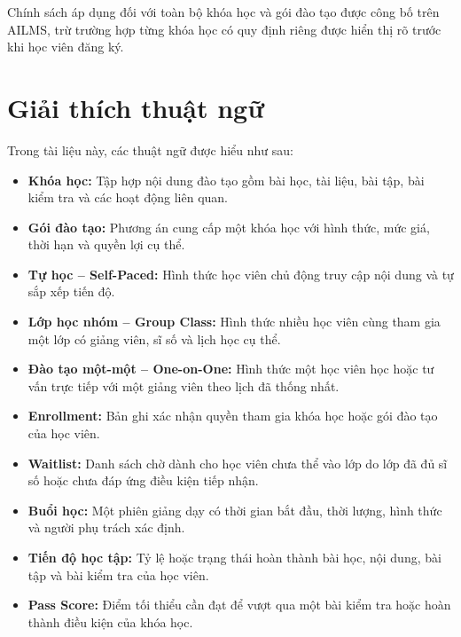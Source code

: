 \documentclass[12pt,a4paper]{article}
\begin{document}
Chính sách áp dụng đối với toàn bộ khóa học và gói đào tạo được công bố
trên AILMS, trừ trường hợp từng khóa học có quy định riêng được hiển thị rõ
trước khi học viên đăng ký.

\section{Giải thích thuật ngữ}

Trong tài liệu này, các thuật ngữ được hiểu như sau:

\begin{itemize}
    \item \textbf{Khóa học:} Tập hợp nội dung đào tạo gồm bài học,
    tài liệu, bài tập, bài kiểm tra và các hoạt động liên quan.

    \item \textbf{Gói đào tạo:} Phương án cung cấp một khóa học với
    hình thức, mức giá, thời hạn và quyền lợi cụ thể.

    \item \textbf{Tự học -- Self-Paced:} Hình thức học viên chủ động
    truy cập nội dung và tự sắp xếp tiến độ.

    \item \textbf{Lớp học nhóm -- Group Class:} Hình thức nhiều học viên
    cùng tham gia một lớp có giảng viên, sĩ số và lịch học cụ thể.

    \item \textbf{Đào tạo một-một -- One-on-One:} Hình thức một học viên
    học hoặc tư vấn trực tiếp với một giảng viên theo lịch đã thống nhất.

    \item \textbf{Enrollment:} Bản ghi xác nhận quyền tham gia khóa học
    hoặc gói đào tạo của học viên.

    \item \textbf{Waitlist:} Danh sách chờ dành cho học viên chưa thể vào lớp
    do lớp đã đủ sĩ số hoặc chưa đáp ứng điều kiện tiếp nhận.

    \item \textbf{Buổi học:} Một phiên giảng dạy có thời gian bắt đầu,
    thời lượng, hình thức và người phụ trách xác định.

    \item \textbf{Tiến độ học tập:} Tỷ lệ hoặc trạng thái hoàn thành bài học,
    nội dung, bài tập và bài kiểm tra của học viên.

    \item \textbf{Pass Score:} Điểm tối thiểu cần đạt để vượt qua
    một bài kiểm tra hoặc hoàn thành điều kiện của khóa học.
\end{itemize}
\end{document}
